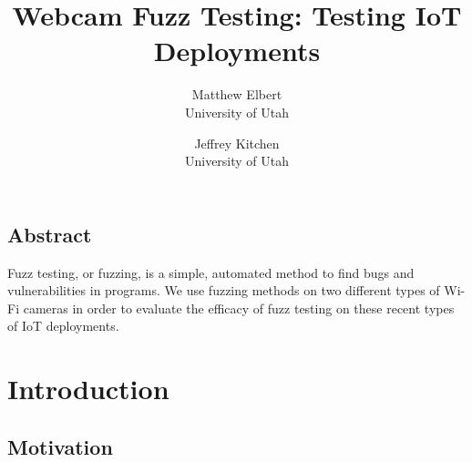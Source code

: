 \documentclass[letterpaper,twocolumn,10pt]{article}
\begin{document}
\date{}

\title{\Large \bf Webcam Fuzz Testing: Testing IoT Deployments}

\author{
{\rm Matthew Elbert}\\
University of Utah
\and
{\rm Jeffrey Kitchen}\\
University of Utah
} %

\maketitle

\thispagestyle{empty}


\subsection*{Abstract}
Fuzz testing, or fuzzing, is a simple, automated method to find bugs and vulnerabilities in programs. We use fuzzing methods on two different types of Wi-Fi cameras in order to evaluate the efficacy of fuzz testing on these recent types of IoT deployments.

\section{Introduction}
\subsection{Motivation}
\end{document}
